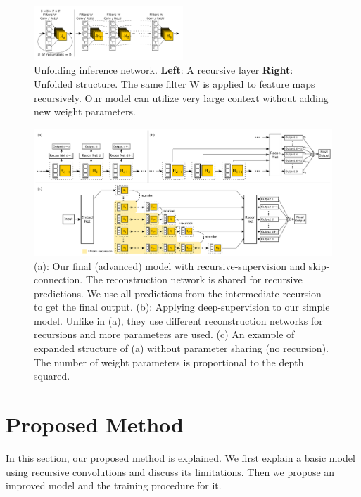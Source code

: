 \documentclass[10pt,twocolumn,letterpaper]{article}
\begin{document}
\begin{figure}[t]
	\includegraphics[width=0.5\textwidth]{figs/f2}
	\caption {Unfolding inference network. \textbf{Left}: A recursive layer \textbf{Right}: Unfolded structure. The same filter W is applied to feature maps recursively. Our model can utilize very large context without adding new weight parameters. }
	\label{fig:inference_network}
\end{figure}


\begin{figure}[t]
\begin{center}
	\includegraphics[width=\textwidth]{figs/f3}
	\caption{(a): Our final (advanced) model with recursive-supervision and skip-connection. The reconstruction network is shared for recursive predictions. We use all predictions from the intermediate recursion to get the final output. (b): Applying deep-supervision \cite{lee2014deeply} to our simple model. Unlike in (a), they use different reconstruction networks for recursions and more parameters are used.  (c) An example of expanded structure of (a) without parameter sharing (no recursion). The number of weight parameters is proportional to the depth squared. }
\label{fig:recursive_supervision}
\end{center}
\end{figure}

\section{Proposed Method}
In this section, our proposed method is explained. We first explain a basic model using recursive convolutions and discuss its limitations. Then we propose an improved model and the training procedure for it.
\end{document}
